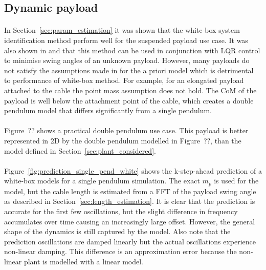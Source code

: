     \subsection{Dynamic payload} \label{sec:dynamic_payload}
        
        \paragraph{}
        In Section~\ref{sec:param_estimation} it was shown that the white-box system identification method
        perform well for the suspended payload use case.
        It was also shown in \cite{Slabber2020} and \cite{Erasmus2020} that this method can be used 
        in conjunction with LQR control to minimise swing angles of an unknown payload.
        However, many payloads do not satisfy the assumptions made in for the a priori model
        which is detrimental to performance of white-box method.
        For example, for an elongated payload attached to the cable the point mass assumption does not hold.
        The CoM of the payload is well below the attachment point of the cable, 
        which creates a double pendulum model that differs significantly from a single pendulum.
        
        \paragraph{}
        Figure~?? shows a practical double pendulum use case. 
        This payload is better represented in 2D by the double pendulum modelled in Figure~??, 
        than the model defined in Section~\ref{sec:plant_considered}.

        
        \paragraph{}
        Figure~\ref{fig:prediction_single_pend_white} shows the k-step-ahead prediction 
        of a white-box models for a single pendulum simulation.
        The exact $m_p$ is used for the model, but the cable length is estimated from a FFT of the payload swing angle 
        as described in Section~\ref{sec:length_estimation}.
        It is clear that the prediction is accurate for the first few oscillations, 
        but the slight difference in frequency accumulates over time causing an increasingly large offset.
        However, the general shape of the dynamics is still captured by the model.
        Also note that the prediction oscillations are damped linearly 
        but the actual oscillations experience non-linear damping.
        This difference is an approximation error because the non-linear plant is modelled with a linear model. 


